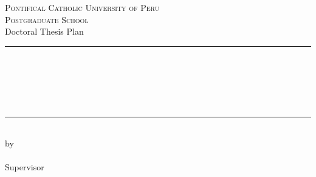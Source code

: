 \documentclass[12pt, twoside]{book} %
\begin{document}

\pagestyle{empty} %
\frontmatter %

\begin{titlepage}
\begin{center}
\vfill
{\large \scshape Pontifical Catholic University of Peru\\Postgraduate School}\\[1.4cm]
{\Large Doctoral Thesis Plan}\\[0.5cm]
\rule{\textwidth}{1.5pt}\\[0cm]
{\huge \bfseries \thesistitle \par \ }\\[-0.5cm]
\rule{\textwidth}{1.5pt}\\[2.5cm]
by\\[1cm]
{\large \bfseries\name}\\[2cm]
Supervisor\\[1cm]
{\large \textbf{\supervisor}} \\ 
\vfill
\vspace{1cm}
\submissiondate
\end{center}
\end{titlepage}


\pagestyle{fancy} %
\renewcommand{\chaptermark}[1]{ \markboth{#1}{}} %
\renewcommand{\sectionmark}[1]{\markright{\thesection\; #1}} %
\fancyhf{}%
\fancyhead[RO,LE]{\thepage} %



\end{document}
